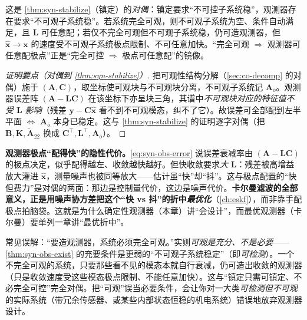 \noindent 这是 \cref{thm:syn-stabilize}（镇定）的\emph{对偶}：镇定要求“不可控子系统稳”，观测器存在要求“不可观子系统稳”。若系统完全可观，则不可观子系统为空、条件自动满足，且 $\mathbf L$ 可任意配；若仅不完全可观但不可观子系统稳，仍可造观测器，但 $\hat{\mathbf x}\to\mathbf x$ 的速度受不可观子系统极点限制、不可任意加快。“完全可观 $\Rightarrow$ 观测器可任意配极点”正是“完全可控 $\Rightarrow$ 极点可任意配”的镜像。

\begin{proof}[证明要点（对偶到 \cref{thm:syn-stabilize}）]
把可观性结构分解（\cref{sec:co-decomp} 的对偶）施于 $(\mathbf A,\mathbf C)$，取坐标使可观块与不可观块分离，不可观子系统记 $\mathbf A_{\bar o}$。观测器误差阵 $(\mathbf A-\mathbf L\mathbf C)$ 在该坐标下亦呈块三角，其谱中\emph{不可观块对应的特征值不受 $\mathbf L$ 影响}（残差 $\mathbf y-\mathbf C\hat{\mathbf x}$ 看不到不可观模态，纠不了它）。故误差可全部配到左半平面 $\iff$ $\mathbf A_{\bar o}$ 本身已稳定。这与 \cref{thm:syn-stabilize} 的证明逐字对偶（把 $\mathbf B,\mathbf K,\tilde{\mathbf A}_{22}$ 换成 $\mathbf C^\top,\mathbf L^\top,\mathbf A_{\bar o}$）。
\end{proof}

\begin{insight}
\textbf{观测器极点“配得快”的隐性代价。}\;\cref{eq:syn-obs-error} 说误差衰减率由 $(\mathbf A-\mathbf L\mathbf C)$ 的极点决定，似乎配得越左、收敛越快越好。但快收敛要求\emph{大} $\mathbf L$：残差被高增益放大灌进 $\hat{\mathbf x}$，测量噪声也被同等放大——估计虽“快”却“抖”。这与极点配置的“快但费力”是对偶的两面：那边是控制量代价，这边是噪声代价。\textbf{卡尔曼滤波的全部意义，正是用噪声协方差把这个“快 vs 抖”的折中\emph{最优化}}（\cref{ch:eskf}），而非靠手配极点拍脑袋。这就是为什么确定性观测器（本章）讲“会设计”，而最优观测器（卡尔曼）要单列一章讲“最优折中”。
\end{insight}

\begin{pitfall}[把“可观”当成观测器存在的必要条件]
常见误解：“要造观测器，系统必须完全可观。”实则\emph{可观是充分、不是必要}——\cref{thm:syn-obs-exist} 的充要条件是更弱的“不可观子系统稳定”（即\emph{可检测}）。一个不完全可观的系统，只要那些看不见的模态本就自行衰减，仍可造出收敛的观测器（只是收敛速度受这些模态极点限制、不能任意加快）。这与“镇定只需可镇定、不必完全可控”完全对偶。把“可观”误当必要条件，会让你对一大类\emph{可检测但不可观}的实际系统（带冗余传感器、或某些内部状态恒稳的机电系统）错误地放弃观测器设计。
\end{pitfall}

